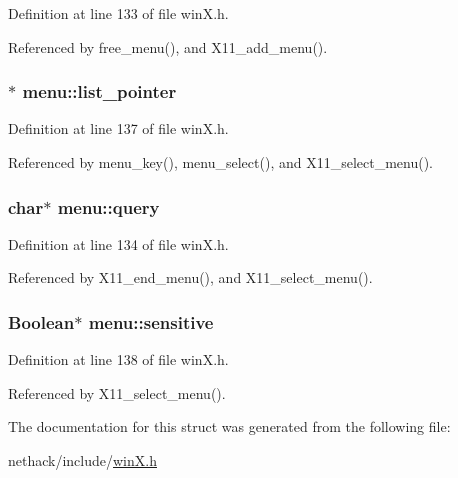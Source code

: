 Definition at line 133 of file win\+X.\+h.



Referenced by free\+\_\+menu(), and X11\+\_\+add\+\_\+menu().

\hypertarget{structmenu_a2178029afde307157f89e6a2fc454636}{
\subsubsection[{list\+\_\+pointer}]{$\ast$ menu\+::list\+\_\+pointer}}\label{structmenu_a2178029afde307157f89e6a2fc454636}


Definition at line 137 of file win\+X.\+h.



Referenced by menu\+\_\+key(), menu\+\_\+select(), and X11\+\_\+select\+\_\+menu().

\hypertarget{structmenu_a2efbe98465e0876eb876ec9c17646bae}{
\subsubsection[{query}]{ char$\ast$ menu\+::query}}\label{structmenu_a2efbe98465e0876eb876ec9c17646bae}


Definition at line 134 of file win\+X.\+h.



Referenced by X11\+\_\+end\+\_\+menu(), and X11\+\_\+select\+\_\+menu().

\hypertarget{structmenu_aa5c38839b8f6012c50835704a25d7f26}{
\subsubsection[{sensitive}]{\setlength{\rightskip}{0pt plus 5cm}Boolean$\ast$ menu\+::sensitive}}\label{structmenu_aa5c38839b8f6012c50835704a25d7f26}


Definition at line 138 of file win\+X.\+h.



Referenced by X11\+\_\+select\+\_\+menu().



The documentation for this struct was generated from the following file\+:\begin{DoxyCompactItemize}
\item 
nethack/include/\hyperlink{winX_8h}{win\+X.\+h}\end{DoxyCompactItemize}
